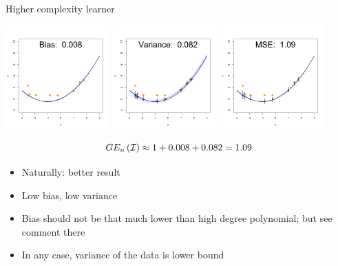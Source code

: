 \documentclass[11pt,compress,t,notes=noshow, xcolor=table]{beamer}
\begin{document}
\begin{vbframe} {Higher complexity learner}
\begin{center}
  \includegraphics[width = 0.3\textwidth]{figure/bias_variance_decomposition-correct_model_bias.png}
  \includegraphics[width = 0.3\textwidth]{figure/bias_variance_decomposition-correct_model_variance.png}
  \includegraphics[width = 0.3\textwidth]{figure/bias_variance_decomposition-correct_model_mse.png}
\end{center}

$$GE_n\left(\mathcal{I}\right) \approx 1 + 0.008 + 0.082 = 1.09 $$

\begin{itemize}
  \item Naturally: better result
  \item Low bias, low variance
  \item Bias should not be that much lower than
  high degree polynomial; but see comment there
  \item In any case, variance of the data is lower bound
\end{itemize}
 

\end{vbframe}
\end{document}
